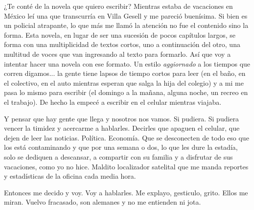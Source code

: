 \documentclass[12pt,twoside,openright,a5paper]{book}
\begin{document}
\vspace{0.5cm}
\hrulefill\hspace{0.2cm} \decofourleft\decofourright \hspace{0.2cm} \hrulefill
\vspace{0.5cm}

¿Te conté de la novela que quiero escribir? Mientras
estaba de vacaciones en México leí una que transcurría en Villa
Gesell y me pareció buenísima. Si bien es un policial atrapante, lo que
más me llamó la atención no fue el contenido sino la forma. Esta novela,
en lugar de ser una sucesión de pocos capítulos largos, se forma con una
multiplicidad de textos cortos, uno a continuación del otro, una multitud
de voces que van ingresando al texto para formarlo. Así que voy a intentar
hacer una novela con ese formato. Un estilo \emph{aggiornado} a los tiempos que
corren digamos... la gente tiene lapsos de tiempo cortos para leer (en el
baño, en el colectivo, en el auto mientras esperan que salga la hija del
colegio) y a mi me pasa lo mismo para escribir (el domingo a la mañana,
alguna noche, un recreo en el trabajo). De hecho la empecé a escribir en
el celular mientras viajaba.


\vspace{0.5cm}
\hrulefill\hspace{0.2cm} \decofourleft\decofourright \hspace{0.2cm} \hrulefill
\vspace{0.5cm}

Y pensar que hay gente que llega y nosotros
nos vamos. Si pudiera. Si pudiera vencer la timidez y acercarme
a hablarles. Decirles que apaguen el celular, que dejen de leer las
noticias. Política. Economía. Que se desconecten de todo eso que los está
contaminando y que por una semana o dos, lo que les dure la estadía, solo
se dediquen a descansar, a compartir con su familia y a disfrutar de sus
vacaciones, como yo no hice. Maldito localizador satelital que me manda
reportes y estadísticas de la oficina cada media hora.

Entonces me decido y voy. Voy a hablarles. Me explayo, gesticulo,
grito. Ellos me miran. Vuelvo fracasado, son alemanes y no me entienden
ni jota.


\vspace{0.5cm}
\hrulefill\hspace{0.2cm} \decofourleft\decofourright \hspace{0.2cm} \hrulefill
\vspace{0.5cm}
\end{document}
